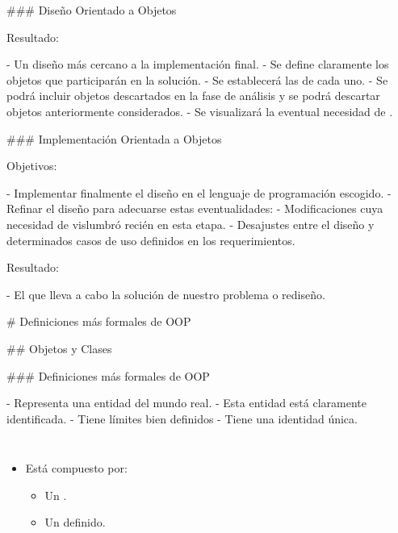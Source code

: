 ### Diseño Orientado a Objetos

Resultado:

- Un diseño más cercano a la implementación final.
- Se define claramente los objetos que participarán en la solución.
    - Se establecerá las  de cada uno.
- Se podrá incluir objetos descartados en la fase de análisis y se
podrá descartar objetos anteriormente considerados.
- Se visualizará la eventual necesidad de .

### Implementación Orientada a Objetos

Objetivos:

- Implementar finalmente el diseño en el lenguaje de programación escogido.
- Refinar el diseño para adecuarse estas eventualidades:
    - Modificaciones cuya necesidad de vislumbró recién en esta etapa.
    - Desajustes entre el diseño y determinados casos de uso definidos en
    los requerimientos.

Resultado:

- El  que lleva a cabo la solución de nuestro problema o rediseño.

# Definiciones más formales de OOP

## Objetos y Clases

### Definiciones más formales de OOP


- Representa una entidad del mundo real.
- Esta entidad está claramente identificada.
    - Tiene límites bien definidos
    - Tiene una identidad única.

\begin{columns}[t,onlytextwidth]
\begin{itemize}
\item Está compuesto por: 
    \begin{itemize}
        \item Un .                 
        \item Un  definido.
    \end{itemize}
\end{itemize}


\end{columns}

